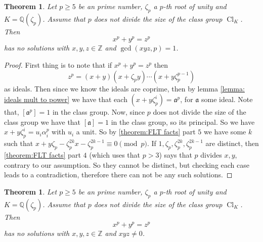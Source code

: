 \documentclass[11pt,a4paper]{amsart}
\theoremstyle{plain}
\newtheorem{theorem}[subsection]{Theorem}
\theoremstyle{definition}
\theoremstyle{definition}
\newcommand{\ZZ}{\mathbb{Z}}
\def\QQ{\mathbb{Q}}
\def \a{\alpha}
\def\gotha{\mathfrak{a}}
\DeclareMathOperator{\Cl}{Cl}
\begin{document}
	\begin{theorem}\label{theorem:FLT case one}
		Let $p \geq 5$ be an prime number, $\zeta_p$ a $p$-th root of unity and $K=\QQ(\zeta_p)$. Assume  that $p$ does not divide the size of  the class group $\Cl_K$. Then \[x^p+y^p=z^p\] has no solutions with $x,y,z \in \ZZ$ and $\gcd(xyz,p)=1$. 
	\end{theorem}
	\begin{proof}
		First thing is to note that if $x^p+y^p=z^p$ then \[z^p=(x+y)(x+\zeta_py)\cdots(x+y\zeta_p^{p-1})\] as ideals. Then since we know the ideals are coprime, then by lemma \ref{lemma: ideals mult to power} we have that each $(x+y\zeta_p^i)=\gotha^p$, for $\gotha$ some ideal. Note that, $[\gotha^p]=1$ in the class group. Now, since $p$ does not divide the size of the class group we have that $[\gotha]=1$ in the class group, so its principal. So we have $x+y\zeta_p^i=u_i\a_i^p$ with $u_i$ a unit. So by \ref{theorem:FLT facts} part $5$ we have some $k$ such that $x+y\zeta_p-\zeta_p^{2k}x-\zeta_p^{2k-1} \equiv 0 \pmod p$. If $1,\zeta_p,\zeta_p^{2k},\zeta_p^{2k-1}$ are distinct, then \ref{theorem:FLT facts} part $4$ (which uses that $p>3$) says that $p$  divides $x,y$, contrary to our assumption. So they cannot be distinct, but checking each case leads to a contradiction, therefore there can not be any such solutions.
	\end{proof}
	
	
	\begin{theorem}\label{FLT regular case}
		Let $p \geq 5$ be an prime number, $\zeta_p$ a $p$-th root of unity and $K=\QQ(\zeta_p)$. Assume  that $p$ does not divide the size of  the class group $\Cl_K$. Then \[x^p+y^p=z^p\] has no solutions with $x,y,z \in \ZZ$ and $xyz \ne 0$. 
	\end{theorem}
	
	
		
	
	
	
	
	
	
	
\end{document}
